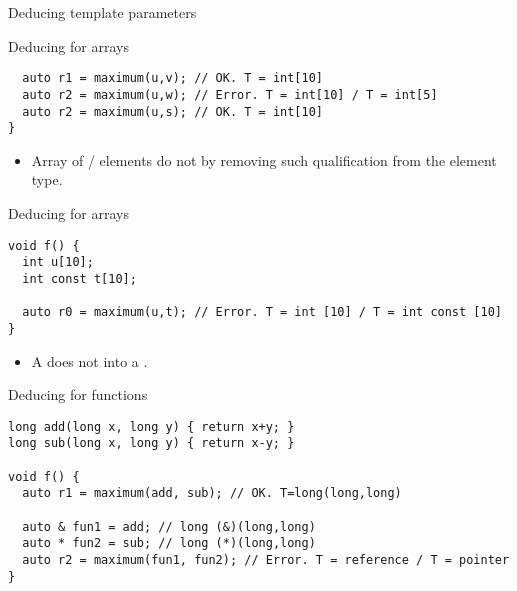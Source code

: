 \begin{frame}{Deducing template parameters}
\begin{block}{Deducing for arrays}
\begin{lstlisting}
  auto r1 = maximum(u,v); // OK. T = int[10]
  auto r2 = maximum(u,w); // Error. T = int[10] / T = int[5]
  auto r2 = maximum(u,s); // OK. T = int[10]
}
\end{lstlisting}
\end{block}

\framebreak

\begin{itemize}
  \item Array of / elements do not 
        by removing such qualification from the element type.
\end{itemize}

\begin{block}{Deducing for arrays}
\begin{lstlisting}
void f() {
  int u[10];
  int const t[10]; 

  auto r0 = maximum(u,t); // Error. T = int [10] / T = int const [10]
}
\end{lstlisting}
\end{block}

\framebreak

\begin{itemize}
  \item A  does not  into a .
\end{itemize}

\begin{block}{Deducing for functions}
\begin{lstlisting}
long add(long x, long y) { return x+y; }
long sub(long x, long y) { return x-y; }

void f() {
  auto r1 = maximum(add, sub); // OK. T=long(long,long)

  auto & fun1 = add; // long (&)(long,long)
  auto * fun2 = sub; // long (*)(long,long)
  auto r2 = maximum(fun1, fun2); // Error. T = reference / T = pointer
}
\end{lstlisting}
\end{block}

\end{frame}
